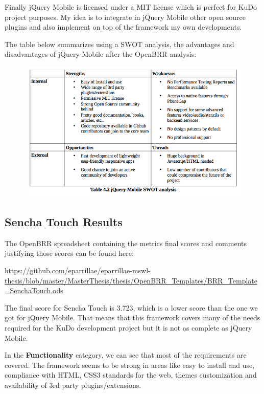 \documentclass[a4paper,12pt]{book}
\begin{document}
Finally jQuery Mobile is licensed under a MIT license which is perfect for KuDo project purposes. My idea is to integrate in jQuery Mobile other open source plugins and also implement on top of the framework my own developments.

The table below summarizes using a SWOT analysis, the advantages and disadvantages of jQuery Mobile after the OpenBRR analysis:

\begin{figure}[H]
    \centering
    \includegraphics[width=13cm, keepaspectratio]{img/table42.png}
 \end{figure}

\subsection{Sencha Touch Results}
\label{Sencha Touch Results}

The OpenBRR spreadsheet containing the metrics final scores and comments justifying those scores can be found here:

\url{
https://github.com/eparrillae/eparrillae-mswl-thesis/blob/master/MasterThesis/thesis/OpenBRR_Templates/BRR_Template_SenchaTouch.ods}

The final score for Sencha Touch is 3.723, which is a lower score than the one we got for jQuery Mobile. That means that this framework covers many of the needs required for the KuDo development project but it is not as complete as jQuery Mobile.

In the \textbf{Functionality} category, we can see that most of the requirements are covered. The framework seems to be strong in areas like easy to install and use, compliance with HTML, CSS3 standards for the web, themes customization and availability of 3rd party plugins/extensions. 
\end{document}
